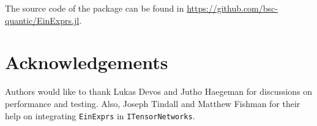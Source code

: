 \documentclass{juliacon}
\begin{document}
The source code of the package can be found in \url{https://github.com/bsc-quantic/EinExprs.jl}.

\section{Acknowledgements}

Authors would like to thank Lukas Devos and Jutho Haegeman for discussions on performance and testing. Also, Joseph Tindall and Matthew Fishman for their help on integrating \texttt{EinExprs} in \texttt{ITensorNetworks}.




\end{document}

